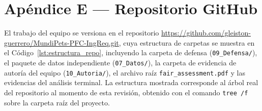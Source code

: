 \documentclass[journal,onecolumn]{IEEEtran}
\begin{document}
	\newpage

	\section*{Apéndice E --- Repositorio GitHub}
	\label{ap:repositorio}
	
	El trabajo del equipo se versiona en el repositorio
	\url{https://github.com/gleiston-guerrero/MundiPets-PFC-IngReq.git}, cuya
	estructura de carpetas se muestra en el Código~\ref{lst:estructura_repo},
	incluyendo la carpeta de defensa (\texttt{09\_Defensa/}), el paquete de
	datos independiente (\texttt{07\_Datos/}), la carpeta de evidencia de
	autoría del equipo (\texttt{10\_Autoria/}), el archivo raíz
	\texttt{fair\_assessment.pdf} y las evidencias del análisis terminal. La
	estructura mostrada corresponde al árbol real del repositorio al momento de
	esta revisión, obtenido con el comando \texttt{tree /f} sobre la carpeta
	raíz del proyecto.
\end{document}
